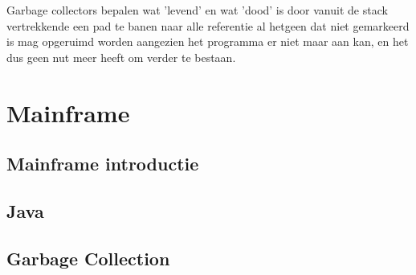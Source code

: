     Garbage collectors bepalen wat 'levend' en wat 'dood' is door vanuit de stack vertrekkende een pad te banen naar alle referentie %
    al hetgeen dat niet gemarkeerd is mag opgeruimd worden aangezien het programma er niet maar aan kan, en het dus geen nut meer heeft om verder te bestaan.
\section{Mainframe}
\label{sec:mainframe}
    \subsection{Mainframe introductie}
    \label{sec:mainframe introductie}
    \subsection{Java}
    \label{sec:mainframe java}
    
    \subsection{Garbage Collection}
    \label{sec:mainframe garbage collection}
